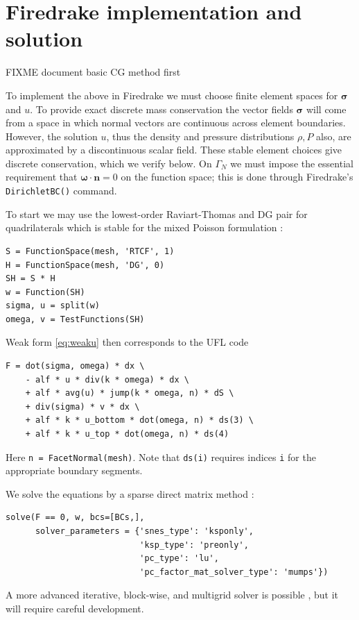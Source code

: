 \documentclass[11pt]{amsart}
\newcommand{\bn}{\mathbf{n}}
\newcommand{\bsigma}{\bm{\sigma}}
\newcommand{\bomega}{\bm{\omega}}
\begin{document}
\section{Firedrake implementation and solution}

FIXME document basic CG method first

To implement the above in Firedrake we must choose finite element spaces for $\bsigma$ and $u$.  To provide exact discrete mass conservation the vector fields $\bsigma$ will come from a space in which normal vectors are continuous across element boundaries.  However, the solution $u$, thus the density and pressure distributions $\rho,P$ also, are approximated by a discontinuous scalar field.  These stable element choices give discrete conservation, which we verify below.  On $\Gamma_N$ we must impose the essential requirement that $\bomega\cdot \bn=0$ on the function space; this is done through Firedrake's \verb|DirichletBC()| command.

To start we may use the lowest-order Raviart-Thomas and DG pair for quadrilaterals which is stable for the mixed Poisson formulation \citep{Arnold2018}:
\begin{Verbatim}[fontsize=\small,frame=lines]
S = FunctionSpace(mesh, 'RTCF', 1)
H = FunctionSpace(mesh, 'DG', 0)
SH = S * H
w = Function(SH)
sigma, u = split(w)
omega, v = TestFunctions(SH)
\end{Verbatim}
Weak form \eqref{eq:weaku} then corresponds to the UFL code
\begin{Verbatim}[fontsize=\small,frame=lines]
F = dot(sigma, omega) * dx \
    - alf * u * div(k * omega) * dx \
    + alf * avg(u) * jump(k * omega, n) * dS \
    + div(sigma) * v * dx \
    + alf * k * u_bottom * dot(omega, n) * ds(3) \
    + alf * k * u_top * dot(omega, n) * ds(4)
\end{Verbatim}
Here \verb|n = FacetNormal(mesh)|.  Note that \verb|ds(i)| requires indices \verb|i| for the appropriate boundary segments.

We solve the equations by a sparse direct matrix method \citep{Amestoy2001}:
\begin{Verbatim}[fontsize=\small,frame=lines]
solve(F == 0, w, bcs=[BCs,],
      solver_parameters = {'snes_type': 'ksponly',
                           'ksp_type': 'preonly',
                           'pc_type': 'lu',
                           'pc_factor_mat_solver_type': 'mumps'})
\end{Verbatim}
A more advanced iterative, block-wise, and multigrid solver is possible \citep[e.g.][]{Bueler2021}, but it will require careful development.
\end{document}

